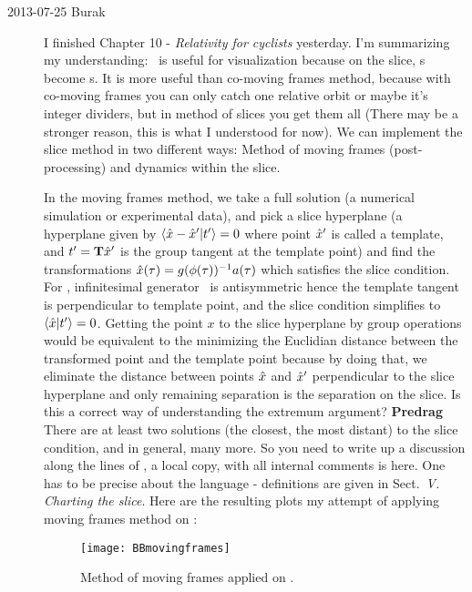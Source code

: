 \begin{description}
\item[2013-07-25  Burak]
I finished  {Chapter
10} - {\em Relativity for cyclists} yesterday. I'm summarizing my
understanding: \Reducedsp\ is useful for visualization because on
the slice, \rpo s become \po s. It
is more useful than co-moving frames method, because with co-moving
frames you can only catch one relative orbit or maybe it's integer
dividers, but in method of slices you get them all (There may be a
stronger reason, this is what I understood for now). We can implement
the slice method in two different ways: Method of moving frames
(post-processing) and dynamics within the slice.

In the moving frames method, we take a full solution (a numerical
simulation or experimental data), and pick a slice hyperplane (a hyperplane
given by $\langle \hat{x} - {\hat{x}'} | t'_{} \rangle = 0$ where
point ${\hat{x}'}$ is called a template, and $t'_{} = \mathbf{T}  {\hat{x}'}$ is
the group tangent at the template point) and find the transformations
$\hat{x}(\tau) = g(\phi(\tau))^{-1} a(\tau)$ which satisfies the slice
condition. For , infinitesimal generator \Lg\  is antisymmetric
hence the template tangent is perpendicular to template point, and the
slice condition simplifies to $\langle \hat{x} | t'_{} \rangle =
0$. Getting the point $x$ to the slice hyperplane by group operations
would be equivalent to the minimizing the Euclidian distance between the
transformed point and the template point because by doing that, we
eliminate the distance between points $\hat{x}$ and ${\hat{x}'}$
perpendicular to the slice hyperplane and only remaining separation is
the separation on the slice.
    {Is this a correct way of understanding the extremum argument? {\bf
    Predrag} There are at least two solutions (the closest, the most
    distant) to the slice condition, and in general, many more. So you
    need to write up a discussion along the lines of , a
    local copy, with all internal comments is 
    {here}. One has to be precise about the language - definitions are given
    in Sect.~\emph{V. Charting the slice}.
    }
Here are
the resulting plots my attempt of applying moving frames method on
\cLf:

\begin{figure}[ht]
\begin{center}
\texttt{[image: BBmovingframes]}
\end{center}
\caption{ Method of moving frames applied on \cLf.
    }
\label{fig:BBmovingframesCL}
\end{figure}


\end{description}

